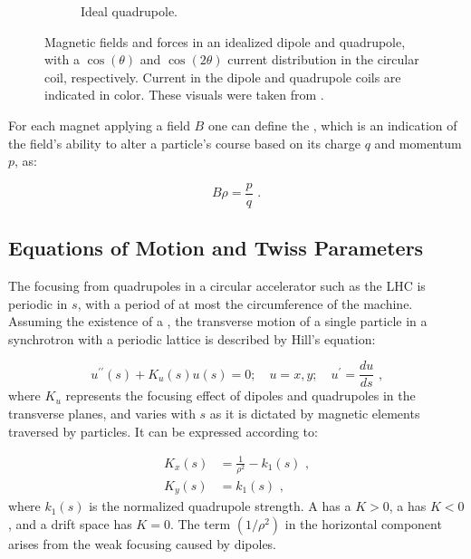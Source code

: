 \begin{figure}[!hbt]
\begin{center}
\begin{subfigure}[b]{0.45\textwidth}
\begin{center}
        \caption{Ideal quadrupole.}
        \label{fig:ideal_quadrupole}
        \end{center}
    \end{subfigure}
    \caption{Magnetic fields and forces in an idealized dipole and quadrupole, with a \(\cos(\theta)\) and \(\cos(2\theta)\) current distribution in the circular coil, respectively. Current in the dipole and quadrupole coils are indicated in color. These visuals were taken from \cite{CERN:Russenschuck:CAS_Design_Magnets}.}
    \label{figure:dipole_quadrupole_fields}
    \end{center}
\end{figure}

For each magnet applying a field \(B\) one can define the , which is an indication of the field's ability to alter a particle's course based on its charge \(q\) and momentum \(p\), as:

\begin{equation}
    B \rho = \frac{p}{q} \text{ .}
    \label{equation:magnetic_rigidity}
\end{equation}

\subsection{Equations of Motion and Twiss Parameters}
\label{subsection:equations_of_motion_and_twiss_parameters}

The focusing from quadrupoles in a circular accelerator such as the LHC is periodic in \(s\), with a period of at most the circumference of the machine.
Assuming the existence of a , the transverse motion of a single particle in a synchrotron with a periodic lattice is described by Hill's equation:

\begin{equation}
    u^{\prime \prime}(s) + K_u(s) u(s) = 0; \quad u = x, y; \quad u^{\prime} = \dfrac{du}{ds} \text{ ,}
    \label{equation:hill_equation}
\end{equation}
where \(K_u\) represents the focusing effect of dipoles and quadrupoles in the transverse planes, and varies with \(s\) as it is dictated by magnetic elements traversed by particles.
It can be expressed according to:

\begin{equation}
	\begin{aligned}
		K_x(s) &= \frac{1}{\rho^2} - k_1(s) \text{ ,} \\
    	K_y(s) &= k_1(s) \text{ ,}
	\end{aligned}
    \label{equation:transverse_focusing_strengths}
\end{equation}
where \(k_1(s)\) is the normalized quadrupole strength.
A  has a \(K > 0\), a  has \(K < 0\), and a drift space has \(K = 0\).
The term \(\left(1 / \rho^2\right)\) in the horizontal component arises from the weak focusing caused by dipoles.

